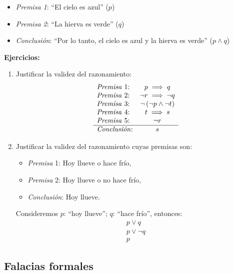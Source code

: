 \begin{enumerate}[label=\alph*)]
	\begin{fmd-example}[Adjunción]
		\begin{itemize}
			\item \textit{Premisa 1}: ``El cielo es azul'' ($p$)
			\item \textit{Premisa 2}: ``La hierva es verde'' ($q$)
			\item \textit{Conclusión}: ``Por lo tanto, el cielo es azul y la hierva es verde'' ($p \land q$)
		\end{itemize}
	\end{fmd-example}
\end{enumerate}

\textbf{Ejercicios:}
\begin{fmd-example}
	\begin{enumerate}
		\item Justificar la validez del razonamiento:
		\[
		\begin{array}{lc}
			\mbox{\textit{Premisa} 1:} & p \implies q\\
			\mbox{\textit{Premisa} 2:} & \neg r \implies \neg q \\
			\mbox{\textit{Premisa} 3:} & \neg \left( \neg p \land \neg t \right) \\
			\mbox{\textit{Premisa} 4:} & t \implies s \\
			\mbox{\textit{Premisa} 5:} & \neg r \\ \hline
			\mbox{\textit{Conclusión}:} & s
		\end{array}
		\]
		\item Justificar la validez del razonamiento cuyas premisas son:
		\begin{itemize}
			\item \textit{Premisa} 1: Hoy llueve o hace frío,
			\item \textit{Premisa} 2: Hoy llueve o no hace frío,
			\item \textit{Conclusión}: Hoy llueve.
		\end{itemize}
		
		Consideremos $p$: ``hoy llueve''; $q$: ``hace frío'', entonces:
		\[ 
		\begin{array}{l}
			p \lor q\\
			p \lor \neg q \\ \hline
			p
		\end{array}
		\]
	\end{enumerate}
\end{fmd-example}

\subsection{Falacias formales}

